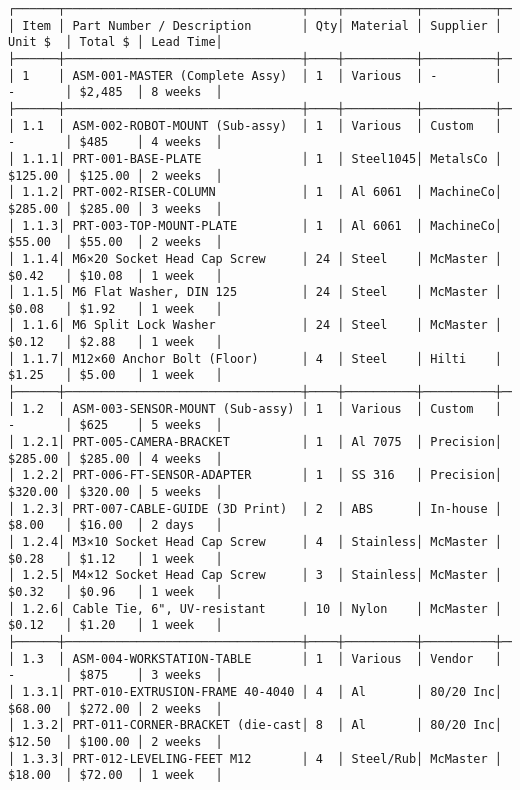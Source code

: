 \documentclass[
]{article}
\begin{document}
\begin{verbatim}
┌──────┬─────────────────────────────────┬────┬──────────┬──────────┬─────────┬─────────┬──────────┐
│ Item │ Part Number / Description       │ Qty│ Material │ Supplier │ Unit $  │ Total $ │ Lead Time│
├──────┼─────────────────────────────────┼────┼──────────┼──────────┼─────────┼─────────┼──────────┤
│ 1    │ ASM-001-MASTER (Complete Assy)  │ 1  │ Various  │ -        │ -       │ $2,485  │ 8 weeks  │
├──────┼─────────────────────────────────┼────┼──────────┼──────────┼─────────┼─────────┼──────────┤
│ 1.1  │ ASM-002-ROBOT-MOUNT (Sub-assy)  │ 1  │ Various  │ Custom   │ -       │ $485    │ 4 weeks  │
│ 1.1.1│ PRT-001-BASE-PLATE              │ 1  │ Steel1045│ MetalsCo │ $125.00 │ $125.00 │ 2 weeks  │
│ 1.1.2│ PRT-002-RISER-COLUMN            │ 1  │ Al 6061  │ MachineCo│ $285.00 │ $285.00 │ 3 weeks  │
│ 1.1.3│ PRT-003-TOP-MOUNT-PLATE         │ 1  │ Al 6061  │ MachineCo│ $55.00  │ $55.00  │ 2 weeks  │
│ 1.1.4│ M6×20 Socket Head Cap Screw     │ 24 │ Steel    │ McMaster │ $0.42   │ $10.08  │ 1 week   │
│ 1.1.5│ M6 Flat Washer, DIN 125         │ 24 │ Steel    │ McMaster │ $0.08   │ $1.92   │ 1 week   │
│ 1.1.6│ M6 Split Lock Washer            │ 24 │ Steel    │ McMaster │ $0.12   │ $2.88   │ 1 week   │
│ 1.1.7│ M12×60 Anchor Bolt (Floor)      │ 4  │ Steel    │ Hilti    │ $1.25   │ $5.00   │ 1 week   │
├──────┼─────────────────────────────────┼────┼──────────┼──────────┼─────────┼─────────┼──────────┤
│ 1.2  │ ASM-003-SENSOR-MOUNT (Sub-assy) │ 1  │ Various  │ Custom   │ -       │ $625    │ 5 weeks  │
│ 1.2.1│ PRT-005-CAMERA-BRACKET          │ 1  │ Al 7075  │ Precision│ $285.00 │ $285.00 │ 4 weeks  │
│ 1.2.2│ PRT-006-FT-SENSOR-ADAPTER       │ 1  │ SS 316   │ Precision│ $320.00 │ $320.00 │ 5 weeks  │
│ 1.2.3│ PRT-007-CABLE-GUIDE (3D Print)  │ 2  │ ABS      │ In-house │ $8.00   │ $16.00  │ 2 days   │
│ 1.2.4│ M3×10 Socket Head Cap Screw     │ 4  │ Stainless│ McMaster │ $0.28   │ $1.12   │ 1 week   │
│ 1.2.5│ M4×12 Socket Head Cap Screw     │ 3  │ Stainless│ McMaster │ $0.32   │ $0.96   │ 1 week   │
│ 1.2.6│ Cable Tie, 6", UV-resistant     │ 10 │ Nylon    │ McMaster │ $0.12   │ $1.20   │ 1 week   │
├──────┼─────────────────────────────────┼────┼──────────┼──────────┼─────────┼─────────┼──────────┤
│ 1.3  │ ASM-004-WORKSTATION-TABLE       │ 1  │ Various  │ Vendor   │ -       │ $875    │ 3 weeks  │
│ 1.3.1│ PRT-010-EXTRUSION-FRAME 40-4040 │ 4  │ Al       │ 80/20 Inc│ $68.00  │ $272.00 │ 2 weeks  │
│ 1.3.2│ PRT-011-CORNER-BRACKET (die-cast│ 8  │ Al       │ 80/20 Inc│ $12.50  │ $100.00 │ 2 weeks  │
│ 1.3.3│ PRT-012-LEVELING-FEET M12       │ 4  │ Steel/Rub│ McMaster │ $18.00  │ $72.00  │ 1 week   │

\end{verbatim}
\end{document}
